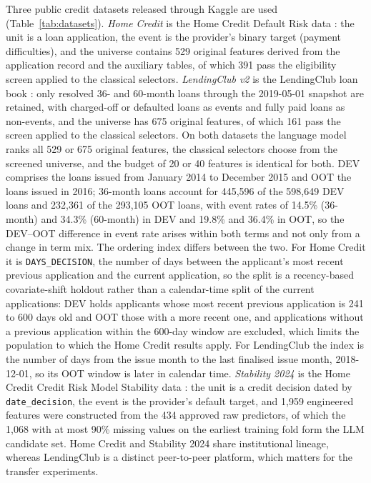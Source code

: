 \documentclass[final,5p,twocolumn]{elsarticle}
\begin{document}
Three public credit datasets released through Kaggle are used (Table~\ref{tab:datasets}). \emph{Home Credit} is the Home Credit Default Risk data \cite{homecredit2018}: the unit is a loan application, the event is the provider's binary target (payment difficulties), and the universe contains 529 original features derived from the application record and the auxiliary tables, of which 391 pass the eligibility screen applied to the classical selectors. \emph{LendingClub v2} is the LendingClub loan book \cite{lendingclub_kaggle}: only resolved 36- and 60-month loans through the 2019-05-01 snapshot are retained, with charged-off or defaulted loans as events and fully paid loans as non-events, and the universe has 675 original features, of which 161 pass the screen applied to the classical selectors. On both datasets the language model ranks all 529 or 675 original features, the classical selectors choose from the screened universe, and the budget of 20 or 40 features is identical for both. DEV comprises the loans issued from January 2014 to December 2015 and OOT the loans issued in 2016; 36-month loans account for 445,596 of the 598,649 DEV loans and 232,361 of the 293,105 OOT loans, with event rates of 14.5\% (36-month) and 34.3\% (60-month) in DEV and 19.8\% and 36.4\% in OOT, so the DEV--OOT difference in event rate arises within both terms and not only from a change in term mix. The ordering index differs between the two. For Home Credit it is \texttt{DAYS\_DECISION}, the number of days between the applicant's most recent previous application and the current application, so the split is a recency-based covariate-shift holdout rather than a calendar-time split of the current applications: DEV holds applicants whose most recent previous application is 241 to 600 days old and OOT those with a more recent one, and applications without a previous application within the 600-day window are excluded, which limits the population to which the Home Credit results apply. For LendingClub the index is the number of days from the issue month to the last finalised issue month, 2018-12-01, so its OOT window is later in calendar time. \emph{Stability 2024} is the Home Credit Credit Risk Model Stability data \cite{homecredit2024}: the unit is a credit decision dated by \texttt{date\_decision}, the event is the provider's default target, and 1,959 engineered features were constructed from the 434 approved raw predictors, of which the 1,068 with at most 90\% missing values on the earliest training fold form the LLM candidate set. Home Credit and Stability 2024 share institutional lineage, whereas LendingClub is a distinct peer-to-peer platform, which matters for the transfer experiments.
\end{document}
